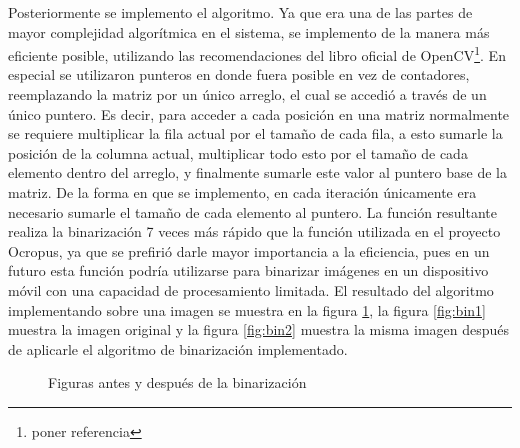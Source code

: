 \documentclass[a4paper, 11pt, oneside]{report}
\begin{document}
Posteriormente se implemento el algoritmo. Ya que era una de las partes de mayor complejidad algorítmica en el sistema, se implemento de la manera más eficiente posible, utilizando las recomendaciones del libro oficial de OpenCV\footnote{poner referencia}. En especial se utilizaron punteros en donde fuera posible en vez de contadores, reemplazando la matriz por un único arreglo, el cual se accedió a través de un único puntero. Es decir, para acceder a cada posición en una matriz normalmente se requiere multiplicar la fila actual por el tamaño de cada fila, a esto sumarle la posición de la columna actual, multiplicar todo esto por el tamaño de cada elemento dentro del arreglo, y finalmente sumarle este valor al puntero base de la matriz. De la forma en que se implemento, en cada iteración únicamente era necesario sumarle el tamaño de cada elemento al puntero. La función resultante realiza la binarización 7 veces más rápido que la función utilizada en el proyecto Ocropus, ya que se prefirió darle mayor importancia a la eficiencia, pues en un futuro esta función podría utilizarse para binarizar imágenes en un dispositivo móvil con una capacidad de procesamiento limitada. El resultado del algoritmo implementando sobre una imagen se muestra en la figura \ref{fig:binarization}, la figura \ref{fig:bin1} muestra la imagen original y la figura \ref{fig:bin2} muestra la misma imagen después de aplicarle el algoritmo de binarización implementado.

	\begin{figure}
	\centering
	\caption{Figuras antes y después de la binarización}
	\label{fig:binarization}
	\end{figure}
\end{document}

